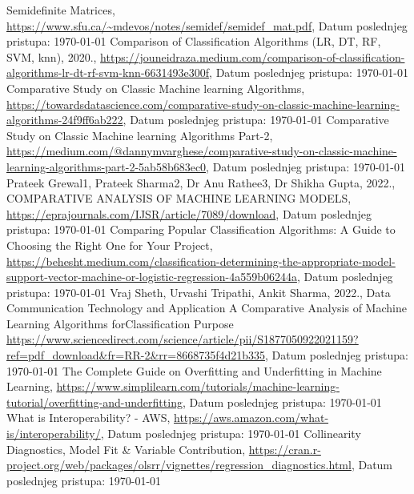 \documentclass[fontsize=12bp, paper=a4]{scrarticle}
\begin{document}
\begin{thebibliography}{1}
    Semidefinite Matrices, \url{https://www.sfu.ca/~mdevos/notes/semidef/semidef_mat.pdf}, Datum poslednjeg pristupa: \today
    Comparison of Classification Algorithms (LR, DT, RF, SVM, knn), 2020., \url{https://jouneidraza.medium.com/comparison-of-classification-algorithms-lr-dt-rf-svm-knn-6631493e300f}, Datum poslednjeg pristupa: \today
    Comparative Study on Classic Machine learning Algorithms, \url{https://towardsdatascience.com/comparative-study-on-classic-machine-learning-algorithms-24f9ff6ab222}, Datum poslednjeg pristupa: \today
    Comparative Study on Classic Machine learning Algorithms Part-2, \url{https://medium.com/@dannymvarghese/comparative-study-on-classic-machine-learning-algorithms-part-2-5ab58b683ec0}, Datum poslednjeg pristupa: \today
    Prateek Grewal1, Prateek Sharma2, Dr Anu Rathee3, Dr Shikha Gupta, 2022., COMPARATIVE ANALYSIS OF MACHINE LEARNING MODELS, \url{https://eprajournals.com/IJSR/article/7089/download}, Datum poslednjeg pristupa: \today
    Comparing Popular Classification Algorithms: A Guide to Choosing the Right One for Your Project, \url{https://behesht.medium.com/classification-determining-the-appropriate-model-support-vector-machine-or-logistic-regression-4a559b06244a}, Datum poslednjeg pristupa: \today
    Vraj Sheth, Urvashi Tripathi, Ankit Sharma, 2022., Data Communication Technology and Application A Comparative Analysis of Machine Learning Algorithms forClassification Purpose  \url{https://www.sciencedirect.com/science/article/pii/S1877050922021159?ref=pdf_download&fr=RR-2&rr=8668735f4d21b335}, Datum poslednjeg pristupa: \today
    The Complete Guide on Overfitting and Underfitting in Machine Learning, \url{https://www.simplilearn.com/tutorials/machine-learning-tutorial/overfitting-and-underfitting}, Datum poslednjeg pristupa: \today
    What is Interoperability? - AWS, \url{https://aws.amazon.com/what-is/interoperability/}, Datum poslednjeg pristupa: \today
    Collinearity Diagnostics, Model Fit \& Variable Contribution, \url{https://cran.r-project.org/web/packages/olsrr/vignettes/regression_diagnostics.html}, Datum poslednjeg pristupa: \today


\end{thebibliography}








\end{document}
